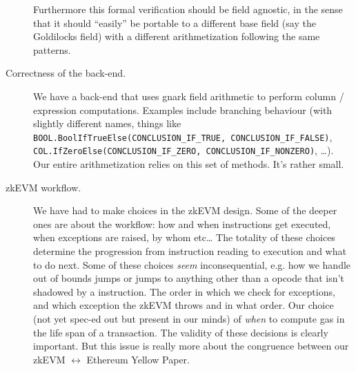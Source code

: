 \documentclass{article}
\begin{document}
\begin{description}
	Furthermore this formal verification should be field agnostic, in the sense that it should ``easily'' be portable to a different base field (say the Goldilocks field) with a different arithmetization following the same patterns.
	\item[Correctness of the back-end.] We have a back-end that uses gnark field arithmetic to perform column / expression computations. Examples include branching behaviour (with slightly different names, things like \texttt{BOOL.BoolIfTrueElse(CONCLUSION\_IF\_TRUE, CONCLUSION\_IF\_FALSE)}, \texttt{COL.IfZeroElse(CONCLUSION\_IF\_ZERO, CONCLUSION\_IF\_NONZERO)}, \dots{}). Our entire arithmetization relies on this set of methods. It's rather small.
	\item[zkEVM workflow.] We have had to make choices in the zkEVM design. Some of the deeper ones are about the workflow: how and when instructions get executed, when exceptions are raised, by whom etc\dots{} The totality of these choices determine the progression from instruction reading to execution and what to do next. Some of these choices \emph{seem} inconsequential, e.g. how we handle out of bounds jumps or jumps to anything other than a  opcode that isn't shadowed by a  instruction. The order in which we check for exceptions, and which exception the zkEVM throws and in what order. Our choice (not yet spec-ed out but present in our minds) of \emph{when} to compute gas in the life span of a transaction. The validity of these decisions is clearly important. But this issue is really more about the congruence between our zkEVM $\longleftrightarrow$ Ethereum Yellow Paper.
\end{description}
\end{document}
